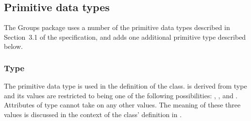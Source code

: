 \subsection{Primitive data types}
\label{new-primitive-types}

The Groups package uses a number of the primitive data types described in Section~3.1 of the \sbmlthreecore specification, and adds one additional primitive type described below.








\subsubsection{Type \fixttspace{}}
\label{primtype-groupkind}

The  primitive data type is used in the definition of the \Group class.   is derived from type  and its values are restricted to being one of the following possibilities: , , and .  Attributes of type  cannot take on any other values.  The meaning of these three values is discussed in the context of the \Group class' definition in .



